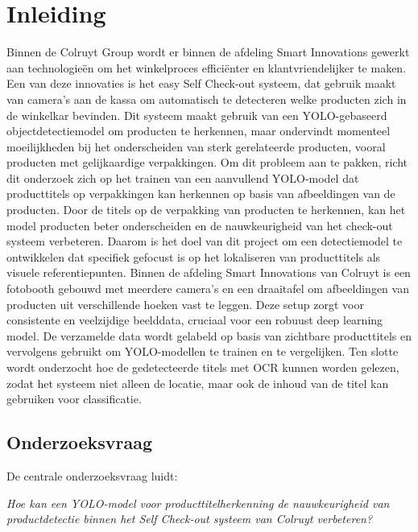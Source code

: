 \section{Inleiding}%
\label{sec:inleiding}

Binnen de Colruyt Group wordt er binnen de afdeling Smart Innovations gewerkt aan technologieën om het winkelproces efficiënter en klantvriendelijker te maken. Een van deze innovaties is het easy Self Check-out systeem, dat gebruik maakt van camera’s aan de kassa om automatisch te detecteren welke producten zich in de winkelkar bevinden. Dit systeem maakt gebruik van een YOLO-gebaseerd objectdetectiemodel om producten te herkennen, maar ondervindt momenteel moeilijkheden bij het onderscheiden van sterk gerelateerde producten, vooral producten met gelijkaardige verpakkingen.
Om dit probleem aan te pakken, richt dit onderzoek zich op het trainen van een aanvullend YOLO-model dat producttitels op verpakkingen kan herkennen op basis van afbeeldingen van de producten. Door de titels op de verpakking van producten te herkennen, kan het model producten beter onderscheiden en de nauwkeurigheid van het check-out systeem verbeteren. Daarom is het doel van dit project om een detectiemodel te ontwikkelen dat specifiek gefocust is op het lokaliseren van producttitels als visuele referentiepunten.
Binnen de afdeling Smart Innovations van Colruyt is een fotobooth gebouwd met meerdere camera’s en een draaitafel om afbeeldingen van producten uit verschillende hoeken vast te leggen. Deze setup zorgt voor consistente en veelzijdige beelddata, cruciaal voor een robuust deep learning model. De verzamelde data wordt gelabeld op basis van zichtbare producttitels en vervolgens gebruikt om YOLO-modellen te trainen en te vergelijken.
Ten slotte wordt onderzocht hoe de gedetecteerde titels met OCR kunnen worden gelezen, zodat het systeem niet alleen de locatie, maar ook de inhoud van de titel kan gebruiken voor classificatie.
\subsection*{Onderzoeksvraag}
De centrale onderzoeksvraag luidt:

\begin{center}
    \textit{Hoe kan een YOLO-model voor producttitelherkenning de nauwkeurigheid van productdetectie binnen het Self Check-out systeem van Colruyt verbeteren?}
\end{center}

